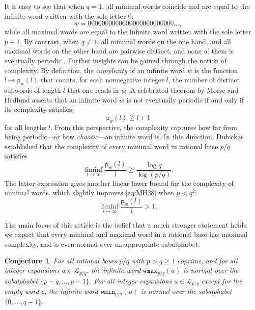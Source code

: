 \documentclass{template_arxiv}
\newtheorem{conjecture}[theorem]{Conjecture}
\numberwithin{equation}{section}
\newcommand{\lan}{\mathcal{L}}
\newcommand{\eps}{\epsilon}
\newcommand{\wmax}{\mathtt{wmax}}
\newcommand{\wmin}{\mathtt{wmin}}
\begin{document}
It is easy to see that when $q=1$, all minimal words coincide and are equal to the infinite word written with the sole letter $0$:
$$ w = 0000000000000000000000000...,$$
while all maximal words are equal to the infinite word
written with the sole letter $p-1$.
By contrast, when $q\neq 1$, all minimal words on the one hand, and all maximal words on the other hand are pairwise distinct, and none of them is eventually periodic \cite[Proposition~26]{AFS08}. Further insights can be gained through the notion of complexity. By definition, the \emph{complexity} of an infinite word $w$ is the function $l \mapsto \mathsf{p}_w(l)$ that counts, for each nonnegative integer $l$, the number of distinct subwords of length $l$ that one reads in $w$. A celebrated theorem by Morse and Hedlund \cite[Theorems~7.3 and 7.4]{MH38} asserts that an infinite word $w$ is not eventually periodic if and only if its complexity satisfies:
\begin{equation}\label{eq:MH38}
    \mathsf{p}_w(l)\geq l+1
\end{equation}
for all lengths $l$.
From this perspective, the complexity captures how far from being periodic---or 
how \emph{chaotic}---an infinite word is.
In this direction, Dubickas \cite[Theorem~3]{Dub09} established that the complexity of every minimal word in rational base $p/q$ satisfies 
\begin{equation}\label{eq:dubickas_complexity}\liminf_{l\rightarrow \infty} \frac{\mathsf{p}_w(l)}{l} \geq \frac{\log q}{\log(p/q)}.
\end{equation}
The latter expression gives another linear lower bound for the complexity of minimal words, which slightly improves \eqref{eq:MH38} when $p<q^2$:
\begin{equation}\label{eq:Dubickas2}\liminf_{l\rightarrow \infty} \frac{\mathsf{p}_w(l)}{l}>1. \end{equation}

 \medskip
 
The main focus of this article is the belief that a much stronger statement holds: we expect that every minimal and maximal word in a rational base has maximal complexity, and is even normal over an appropriate subalphabet. 

\begin{conjecture}\label{conj:normality}
	For all rational bases $p/q$ with $p>q\geq 1$ coprime, and for all integer expansions $u\in\lan_{p/q}$, the infinite word $\wmax_{p/q}(u)$ is normal over the subalphabet $\{p-q,\dots,p-1\}$.  For all integer expansions $u\in\lan_{p/q}$ except for the empty word $\eps$, the infinite word $\wmin_{p/q}(u)$ is normal over the subalphabet $\{0,\dots,q-1\}$. 
\end{conjecture}
\end{document}
